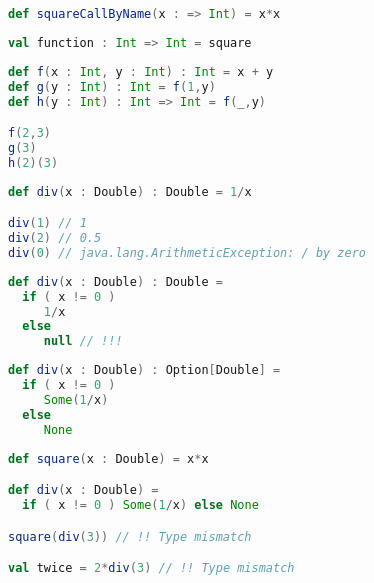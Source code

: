 \documentclass[10pt]{beamer}
\begin{document}
{\begin{frame}[fragile]
\begin{lstlisting}[language=Scala, basicstyle=\ttfamily]
def squareCallByName(x : => Int) = x*x
\end{lstlisting}
\end{frame}


\begin{frame}[fragile]
\begin{lstlisting}[language=Scala, basicstyle=\ttfamily]
val function : Int => Int = square
\end{lstlisting}
\end{frame}

\begin{frame}[fragile]
\begin{lstlisting}[language=Scala, basicstyle=\ttfamily]
def f(x : Int, y : Int) : Int = x + y
def g(y : Int) : Int = f(1,y)
def h(y : Int) : Int => Int = f(_,y)

f(2,3)
g(3)
h(2)(3)
\end{lstlisting}
\end{frame}

}

\begin{frame}[fragile]
\begin{lstlisting}[language=Scala, basicstyle=\ttfamily]
def div(x : Double) : Double = 1/x

div(1) // 1 
div(2) // 0.5 
div(0) // java.lang.ArithmeticException: / by zero
\end{lstlisting}
\end{frame}


\begin{frame}[fragile]
\begin{lstlisting}[language=Scala, basicstyle=\ttfamily]
def div(x : Double) : Double = 
  if ( x != 0 ) 
     1/x 
  else 
     null // !!!
\end{lstlisting}
\end{frame}

\begin{frame}[fragile]
\begin{lstlisting}[language=Scala, basicstyle=\ttfamily]
def div(x : Double) : Option[Double] =
  if ( x != 0 ) 
     Some(1/x) 
  else 
     None
\end{lstlisting}
\end{frame}

\begin{frame}[fragile]
\begin{lstlisting}[language=Scala, basicstyle=\ttfamily]
def square(x : Double) = x*x 

def div(x : Double) = 
  if ( x != 0 ) Some(1/x) else None

square(div(3)) // !! Type mismatch 

val twice = 2*div(3) // !! Type mismatch 
\end{lstlisting}
\end{frame}
\end{document}
